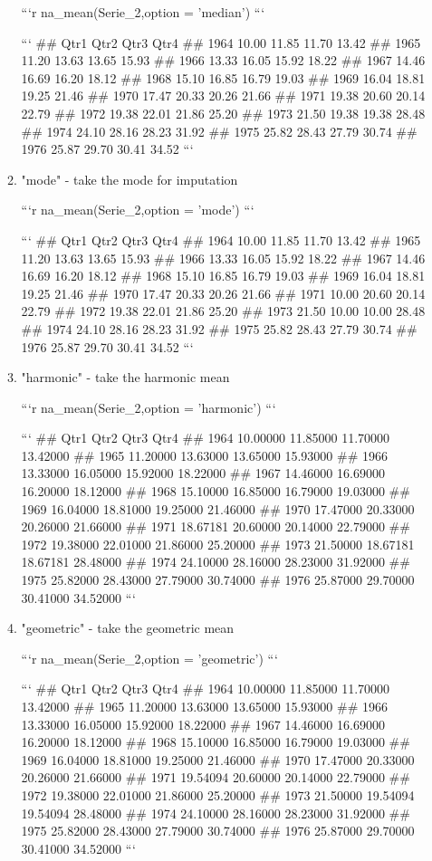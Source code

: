 \documentclass[
]{article}
\begin{document}
\begin{enumerate}
\begin{enumerate}
```r
na_mean(Serie_2,option = 'median')
```

```
##       Qtr1  Qtr2  Qtr3  Qtr4
## 1964 10.00 11.85 11.70 13.42
## 1965 11.20 13.63 13.65 15.93
## 1966 13.33 16.05 15.92 18.22
## 1967 14.46 16.69 16.20 18.12
## 1968 15.10 16.85 16.79 19.03
## 1969 16.04 18.81 19.25 21.46
## 1970 17.47 20.33 20.26 21.66
## 1971 19.38 20.60 20.14 22.79
## 1972 19.38 22.01 21.86 25.20
## 1973 21.50 19.38 19.38 28.48
## 1974 24.10 28.16 28.23 31.92
## 1975 25.82 28.43 27.79 30.74
## 1976 25.87 29.70 30.41 34.52
```
\item "mode" - take the mode for imputation

```r
na_mean(Serie_2,option = 'mode')
```

```
##       Qtr1  Qtr2  Qtr3  Qtr4
## 1964 10.00 11.85 11.70 13.42
## 1965 11.20 13.63 13.65 15.93
## 1966 13.33 16.05 15.92 18.22
## 1967 14.46 16.69 16.20 18.12
## 1968 15.10 16.85 16.79 19.03
## 1969 16.04 18.81 19.25 21.46
## 1970 17.47 20.33 20.26 21.66
## 1971 10.00 20.60 20.14 22.79
## 1972 19.38 22.01 21.86 25.20
## 1973 21.50 10.00 10.00 28.48
## 1974 24.10 28.16 28.23 31.92
## 1975 25.82 28.43 27.79 30.74
## 1976 25.87 29.70 30.41 34.52
```
\item "harmonic" - take the harmonic mean

```r
na_mean(Serie_2,option = 'harmonic')
```

```
##          Qtr1     Qtr2     Qtr3     Qtr4
## 1964 10.00000 11.85000 11.70000 13.42000
## 1965 11.20000 13.63000 13.65000 15.93000
## 1966 13.33000 16.05000 15.92000 18.22000
## 1967 14.46000 16.69000 16.20000 18.12000
## 1968 15.10000 16.85000 16.79000 19.03000
## 1969 16.04000 18.81000 19.25000 21.46000
## 1970 17.47000 20.33000 20.26000 21.66000
## 1971 18.67181 20.60000 20.14000 22.79000
## 1972 19.38000 22.01000 21.86000 25.20000
## 1973 21.50000 18.67181 18.67181 28.48000
## 1974 24.10000 28.16000 28.23000 31.92000
## 1975 25.82000 28.43000 27.79000 30.74000
## 1976 25.87000 29.70000 30.41000 34.52000
```
\item "geometric" - take the geometric mean

```r
na_mean(Serie_2,option = 'geometric')
```

```
##          Qtr1     Qtr2     Qtr3     Qtr4
## 1964 10.00000 11.85000 11.70000 13.42000
## 1965 11.20000 13.63000 13.65000 15.93000
## 1966 13.33000 16.05000 15.92000 18.22000
## 1967 14.46000 16.69000 16.20000 18.12000
## 1968 15.10000 16.85000 16.79000 19.03000
## 1969 16.04000 18.81000 19.25000 21.46000
## 1970 17.47000 20.33000 20.26000 21.66000
## 1971 19.54094 20.60000 20.14000 22.79000
## 1972 19.38000 22.01000 21.86000 25.20000
## 1973 21.50000 19.54094 19.54094 28.48000
## 1974 24.10000 28.16000 28.23000 31.92000
## 1975 25.82000 28.43000 27.79000 30.74000
## 1976 25.87000 29.70000 30.41000 34.52000
```
\end{enumerate}


\end{enumerate}
\end{document}
